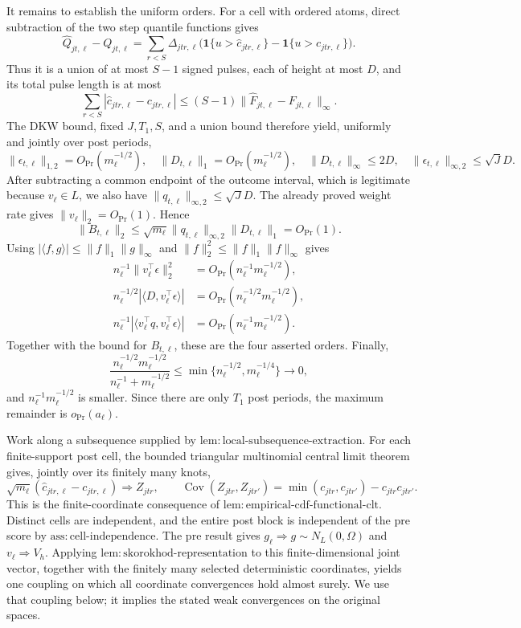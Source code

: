 It remains to establish the uniform orders.  For a cell with ordered atoms, direct subtraction of the two step quantile functions gives
\[
 \widehat Q_{jt,\ell}-Q_{jt,\ell}
 =\sum_{r<S}\Delta_{jtr,\ell}
 \bigl(\mathbf 1\{u>\widehat c_{jtr,\ell}\}
       -\mathbf 1\{u>c_{jtr,\ell}\}\bigr).
\]
Thus it is a union of at most \(S-1\) signed pulses, each of height at most \(D\), and its total pulse length is at most
\[
 \sum_{r<S}|\widehat c_{jtr,\ell}-c_{jtr,\ell}|
 \leq(S-1)\|\widehat F_{jt,\ell}-F_{jt,\ell}\|_\infty.
\]
The DKW bound, fixed \(J,T_1,S\), and a union bound therefore yield, uniformly and jointly over post periods,
\[
 \|\epsilon_{t,\ell}\|_{1,2}=O_{\Pr}(m_\ell^{-1/2}),\quad
 \|D_{t,\ell}\|_1=O_{\Pr}(m_\ell^{-1/2}),\quad
 \|D_{t,\ell}\|_\infty\leq2D,
 \quad \|\epsilon_{t,\ell}\|_{\infty,2}\leq\sqrt J D.
\]
After subtracting a common endpoint of the outcome interval, which is legitimate because \(v_\ell\in L\), we also have
\(\|q_{t,\ell}\|_{\infty,2}\leq\sqrt J D\).  The already proved weight rate gives \(\|v_\ell\|_2=O_{\Pr}(1)\).  Hence
\[
 \|B_{t,\ell}\|_2
 \leq\sqrt{m_\ell}\|q_{t,\ell}\|_{\infty,2}\|D_{t,\ell}\|_1
 =O_{\Pr}(1).
\]
Using \(|\langle f,g\rangle|\leq\|f\|_1\|g\|_\infty\) and
\(\|f\|_2^2\leq\|f\|_1\|f\|_\infty\) gives
\[
\begin{aligned}
 n_\ell^{-1}\|v_\ell^\top\epsilon\|_2^2
 &=O_{\Pr}(n_\ell^{-1}m_\ell^{-1/2}),\\
 n_\ell^{-1/2}|\langle D,v_\ell^\top\epsilon\rangle|
 &=O_{\Pr}(n_\ell^{-1/2}m_\ell^{-1/2}),\\
 n_\ell^{-1}|\langle v_\ell^\top q,v_\ell^\top\epsilon\rangle|
 &=O_{\Pr}(n_\ell^{-1}m_\ell^{-1/2}).
\end{aligned}
\]
Together with the bound for \(B_{t,\ell}\), these are the four asserted orders.  Finally,
\[
 \frac{n_\ell^{-1/2}m_\ell^{-1/2}}
 {n_\ell^{-1}+m_\ell^{-1/2}}
 \leq\min\{n_\ell^{-1/2},m_\ell^{-1/4}\}\longrightarrow0,
\]
and \(n_\ell^{-1}m_\ell^{-1/2}\) is smaller.  Since there are only \(T_1\) post periods, the maximum remainder is \(o_{\Pr}(a_\ell)\).

Work along a subsequence supplied by \(\mathrm{lem:local\mbox{-}subsequence\mbox{-}extraction}\).  For each finite-support post cell, the bounded triangular multinomial central limit theorem gives, jointly over its finitely many knots,
\[
 \sqrt{m_\ell}(\widehat c_{jtr,\ell}-c_{jtr,\ell})
 \Rightarrow Z_{jtr},
 \qquad
 \operatorname{Cov}(Z_{jtr},Z_{jtr'})
 =\min(c_{jtr},c_{jtr'})-c_{jtr}c_{jtr'}.
\]
This is the finite-coordinate consequence of
\(\mathrm{lem:empirical\mbox{-}cdf\mbox{-}functional\mbox{-}clt}\).  Distinct cells are independent, and the entire post block is independent of the pre score by \(\mathrm{ass:cell\mbox{-}independence}\).  The pre result gives \(g_\ell\Rightarrow g\sim N_L(0,\Omega)\) and \(v_\ell\Rightarrow V_h\).  Applying \(\mathrm{lem:skorokhod\mbox{-}representation}\) to this finite-dimensional joint vector, together with the finitely many selected deterministic coordinates, yields one coupling on which all coordinate convergences hold almost surely.  We use that coupling below; it implies the stated weak convergences on the original spaces.

